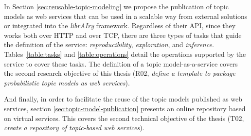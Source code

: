In Section \ref{sec:reusable-topic-modeling} we propose the publication of topic models as web services that can be used in a scalable way from external solutions or integrated into the \textit{librAIry} framework. Regardless of their API, since they works both over HTTP and over TCP, there are three types of tasks that guide the definition of the service: \textit{reproducibility}, \textit{exploration}, and \textit{inference}. Tables~\ref{table:tasks} and \ref{table:operations} detail the operations  supported by the service to cover these tasks. The definition of a topic model-as-a-service covers the second research objective of this thesis (R02, \textit{define a template to package probabilistic topic models as web services}).
 
And finally, in order to facilitate the reuse of the topic models published as web services, section \ref{sec:topic-model-publication} presents an online repository based on virtual services. This covers the second technical objective of the thesis (T02, \textit{create a repository of topic-based web services}). 
 

